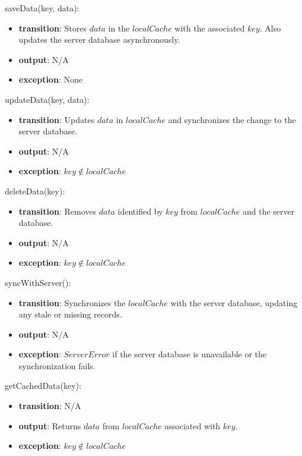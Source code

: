 \documentclass[12pt, titlepage]{article}
\begin{document}
\noindent saveData(key, data):
\begin{itemize}
  \item \textbf{transition}:
        Stores \( data \) in the \( localCache \) with the associated \( key \). Also updates the server database asynchronously.
  \item \textbf{output}: N/A
  \item \textbf{exception}: None
\end{itemize}

\noindent updateData(key, data):
\begin{itemize}
  \item \textbf{transition}:
        Updates \( data \) in \( localCache \) and synchronizes the change to the server database.
  \item \textbf{output}: N/A
  \item \textbf{exception}: \( key \notin localCache \)
\end{itemize}

\noindent deleteData(key):
\begin{itemize}
  \item \textbf{transition}:
        Removes \( data \) identified by \( key \) from \( localCache \) and the server database.
  \item \textbf{output}: N/A
  \item \textbf{exception}: \( key \notin localCache \)
\end{itemize}

\noindent syncWithServer():
\begin{itemize}
  \item \textbf{transition}:
        Synchronizes the \( localCache \) with the server database, updating any stale or missing records.
  \item \textbf{output}: N/A
  \item \textbf{exception}: \( ServerError \) if the server database is unavailable or the synchronization fails.
\end{itemize}

\noindent getCachedData(key):
\begin{itemize}
  \item \textbf{transition}: N/A
  \item \textbf{output}: Returns \( data \) from \( localCache \) associated with \( key \).
  \item \textbf{exception}: \( key \notin localCache \)
\end{itemize}
\end{document}
